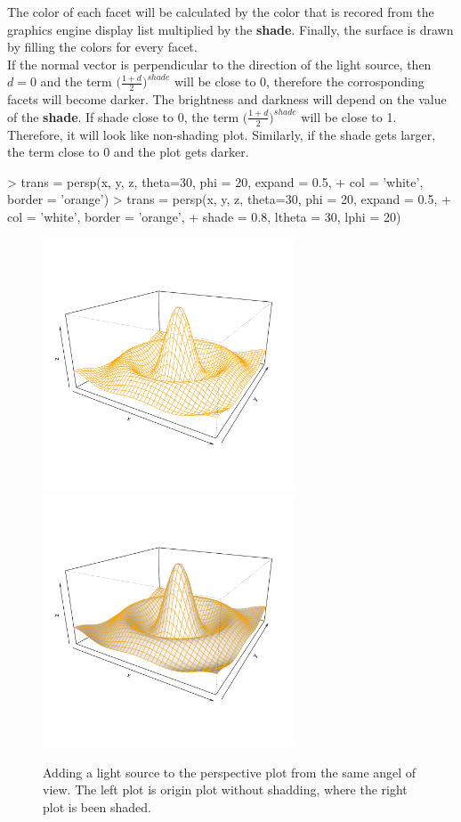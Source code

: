 \documentclass[paper=a4, fontsize=11pt]{report}
\begin{document}
The color of each facet will be calculated by the color that is recored from the graphics engine display list multiplied by the \textbf{shade}. Finally, the surface is drawn by filling the colors for every facet.\\

If the normal vector is perpendicular to the direction of the light source, then $d = 0$ and the term $\big(\frac{1 + d}{2}\big)^{shade}$ will be close to 0, therefore the corrosponding facets will become darker. The brightness and darkness will depend on the value of the \textbf{shade}. If shade close to 0, the term $\big(\frac{1 + d}{2}\big)^{shade}$ will be close to 1. Therefore, it will look like non-shading plot. Similarly, if the shade gets larger, the term close to 0 and the plot gets darker.

\begin{Schunk}
\begin{Sinput}
> trans = persp(x, y, z, theta=30, phi = 20, expand = 0.5,
+  col = 'white', border = 'orange')
> trans = persp(x, y, z, theta=30, phi = 20, expand = 0.5,
+  col = 'white', border = 'orange', 
+  shade = 0.8, ltheta = 30, lphi = 20)
\end{Sinput}
\end{Schunk}


\begin{figure}[h]
\begin{center}
  \includegraphics[height = 7.5cm, width = 7.5cm]{figure/Lighting_1.pdf}
  \includegraphics[height = 7.5cm, width = 7.5cm]{figure/Lighting_2.pdf}
  \caption{Adding a light source to the perspective plot from the same angel of view. The left plot is origin plot without shadding, where the right plot is been shaded.}
  	\label{figure_3.3}
\end{center}
\end{figure}
\end{document}
